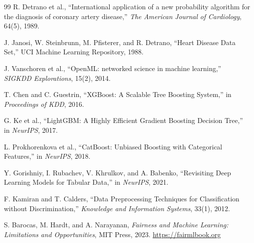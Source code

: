 ﻿\documentclass[11pt]{article}
\begin{document}
\begin{thebibliography}{99}
R. Detrano et al., ``International application of a new probability algorithm for the diagnosis of coronary artery disease,'' \emph{The American Journal of Cardiology}, 64(5), 1989.

J. Janosi, W. Steinbrunn, M. Pfisterer, and R. Detrano, ``Heart Disease Data Set,'' UCI Machine Learning Repository, 1988.

J. Vanschoren et al., ``OpenML: networked science in machine learning,'' \emph{SIGKDD Explorations}, 15(2), 2014.

T. Chen and C. Guestrin, ``XGBoost: A Scalable Tree Boosting System,'' in \emph{Proceedings of KDD}, 2016.

G. Ke et al., ``LightGBM: A Highly Efficient Gradient Boosting Decision Tree,'' in \emph{NeurIPS}, 2017.

L. Prokhorenkova et al., ``CatBoost: Unbiased Boosting with Categorical Features,'' in \emph{NeurIPS}, 2018.

Y. Gorishniy, I. Rubachev, V. Khrulkov, and A. Babenko, ``Revisiting Deep Learning Models for Tabular Data,'' in \emph{NeurIPS}, 2021.

F. Kamiran and T. Calders, ``Data Preprocessing Techniques for Classification without Discrimination,'' \emph{Knowledge and Information Systems}, 33(1), 2012.

S. Barocas, M. Hardt, and A. Narayanan, \emph{Fairness and Machine Learning: Limitations and Opportunities}, MIT Press, 2023. \url{https://fairmlbook.org}
\end{thebibliography}
\end{document}
